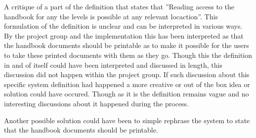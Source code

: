 A critique of a part of the definition that states that ''Reading access to the handbook for any the levels is possible at any relevant locaction''.
This formulation of the definition is unclear and can be interpreted in various ways.
By the project group and the implementation this has been interpreted as that the handbook documents should be printable as to make it possible for the users to take these printed documents with them as they go.
Though this the definition in and of itself could have been interpreted and discussed in length, this discussion did not happen within the project group.
If such discussion about this specific system definition had happened a more creative or out of the box idea or solution could have occured.
Though as it is the definition remains vague and no interesting discussions about it happened during the process.

Another possible solution could have been to simple rephrase the system to state that the handbook documents should be printable.
